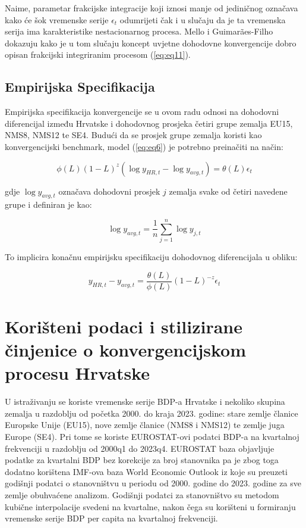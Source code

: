 \documentclass{crebsshr}
\begin{document}
    Naime, parametar frakcijske integracije koji iznosi manje od jediničnog označava kako će šok vremenske serije \( \epsilon_t \) odumrijeti čak i u slučaju da je ta vremenska serija ima karakteristike nestacionarnog procesa. Mello i Guimarães-Filho \citeyearpar{Mello2007} dokazuju kako je u tom slučaju koncept uvjetne dohodovne konvergencije dobro opisan frakcijski integriranim procesom (\ref{eq:eq11}).
    
    \subsection{Empirijska Specifikacija}
    
    Empirijska specifikacija konvergencije se u ovom radu odnosi na dohodovni diferencijal između Hrvatske i dohodovnog prosjeka četiri grupe zemalja EU15, NMS8, NMS12 te SE4. Budući da se prosjek grupe zemalja koristi kao konvergencijski benchmark, model (\ref{eq:eq6}) je potrebno preinačiti na način:
    
    \begin{equation} \label{eq:eq14}
    \phi(L)(1-L)^z (\log y_{HR,t} - \log y_{avg,t}) = \theta(L)\epsilon_t
    \end{equation}
    
    gdje \( \log y_{avg,t} \) označava dohodovni prosjek \( j \) zemalja svake od četiri navedene grupe i definiran je kao:
    
    \begin{equation} \label{eq:eq15}
    \log y_{avg,t} = \frac{1}{n}\sum_{j=1}^{n} \log y_{j,t}
    \end{equation}
    
    To implicira konačnu empirijsku specifikaciju dohodovnog diferencijala u obliku:
    
    \begin{equation} \label{eq:eq16}
    y_{HR,t} - y_{avg,t} = \frac{\theta(L)}{\phi(L)}(1-L)^{-z}\epsilon_t
    \end{equation}

\section{Korišteni podaci i stilizirane činjenice o konvergencijskom procesu Hrvatske}

U istraživanju se koriste vremenske serije BDP-a Hrvatske i nekoliko skupina zemalja u razdoblju od početka 2000. do kraja 2023. godine: stare zemlje članice Europske Unije (EU15), nove zemlje članice (NMS8 i NMS12) te zemlje juga Europe (SE4). Pri tome se koriste EUROSTAT-ovi podatci BDP-a na kvartalnoj frekvenciji u razdoblju od 2000q1 do 2023q4. EUROSTAT baza objavljuje podatke za kvartalni BDP bez korekcije za broj stanovnika pa je zbog toga dodatno korištena IMF-ova baza World Economic Outlook iz koje su preuzeti godišnji podatci o stanovništvu u periodu od 2000. godine do 2023. godine za sve zemlje obuhvaćene analizom. Godišnji podatci za stanovništvo su metodom kubične interpolacije svedeni na kvartalne, nakon čega su korišteni u formiranju vremenske serije BDP per capita na kvartalnoj frekvenciji.
\end{document}

